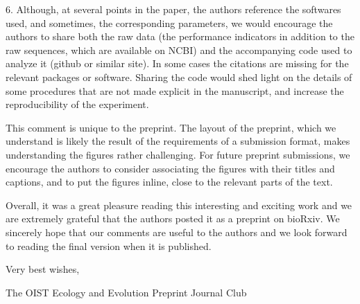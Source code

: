 \documentclass[10pt]{article}
\begin{document}
\par\null

6. Although, at several points in the paper, the authors reference the
softwares used, and sometimes, the corresponding parameters, we would
encourage the authors to share both the raw data (the performance
indicators in addition to the raw sequences, which are available on
NCBI) and the accompanying code used to analyze it (github or similar
site). In some cases the citations are missing for the relevant packages
or software. Sharing the code would shed light on the details of some
procedures that are not made explicit in the manuscript, and increase
the reproducibility of the experiment.

\par\null

This comment is unique to the preprint. The layout of the preprint,
which we understand is likely the result of the requirements of a
submission format, makes understanding the figures rather challenging.
For future preprint submissions, we encourage the authors to consider
associating the figures with their titles and captions, and to put the
figures inline, close to the relevant parts of the text.

\par\null

Overall, it was a great pleasure reading this interesting and exciting
work and we are extremely grateful that the authors posted it as a
preprint on bioRxiv. We sincerely hope that our comments are useful to
the authors and we look forward to reading the final version when it is
published.~

\par\null

Very best wishes,

The OIST Ecology and Evolution Preprint Journal Club

\FloatBarrier
\end{document}
